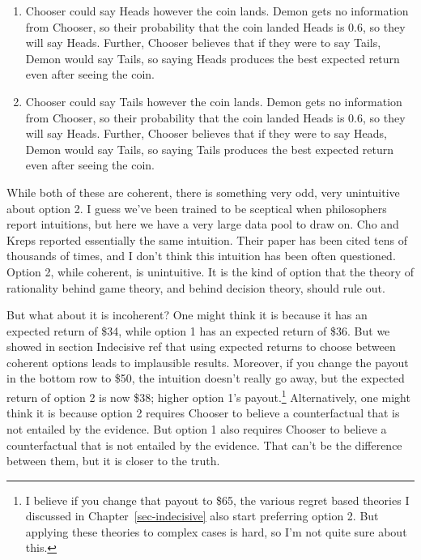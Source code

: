 \documentclass[
  12pt,
  letterpaper,
  DIV=11,
  numbers=noendperiod]{scrreprt}
\providecommand{\tightlist}{%
  \setlength{\itemsep}{0pt}\setlength{\parskip}{0pt}}\usepackage{longtable,booktabs,array}
\begin{document}
\begin{enumerate}
\def\labelenumi{\arabic{enumi}.}
\tightlist
\item
  Chooser could say Heads however the coin lands. Demon gets no
  information from Chooser, so their probability that the coin landed
  Heads is 0.6, so they will say Heads. Further, Chooser believes that
  if they were to say Tails, Demon would say Tails, so saying Heads
  produces the best expected return even after seeing the coin.
\item
  Chooser could say Tails however the coin lands. Demon gets no
  information from Chooser, so their probability that the coin landed
  Heads is 0.6, so they will say Heads. Further, Chooser believes that
  if they were to say Heads, Demon would say Tails, so saying Tails
  produces the best expected return even after seeing the coin.
\end{enumerate}

While both of these are coherent, there is something very odd, very
unintuitive about option 2. I guess we've been trained to be sceptical
when philosophers report intuitions, but here we have a very large data
pool to draw on. Cho and Kreps reported essentially the same intuition.
Their paper has been cited tens of thousands of times, and I don't think
this intuition has been often questioned. Option 2, while coherent, is
unintuitive. It is the kind of option that the theory of rationality
behind game theory, and behind decision theory, should rule out.

But what about it is incoherent? One might think it is because it has an
expected return of \$34, while option 1 has an expected return of \$36.
But we showed in section Indecisive ref that using expected returns to
choose between coherent options leads to implausible results. Moreover,
if you change the payout in the bottom row to \$50, the intuition
doesn't really go away, but the expected return of option 2 is now \$38;
higher option 1's payout.\footnote{I believe if you change that payout
  to \$65, the various regret based theories I discussed in
  Chapter~\ref{sec-indecisive} also start preferring option 2. But
  applying these theories to complex cases is hard, so I'm not quite
  sure about this.} Alternatively, one might think it is because option
2 requires Chooser to believe a counterfactual that is not entailed by
the evidence. But option 1 also requires Chooser to believe a
counterfactual that is not entailed by the evidence. That can't be the
difference between them, but it is closer to the truth.
\end{document}
